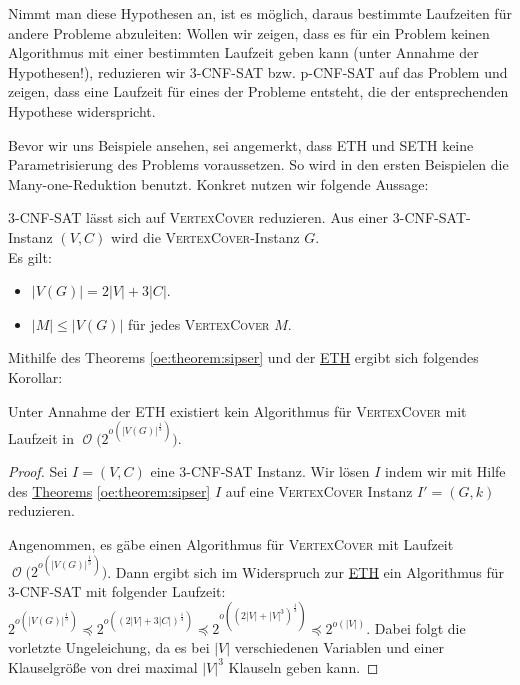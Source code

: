 \documentclass[a4paper,ngerman]{atseminar}
\newcommand{\BigO}[1]{\ensuremath{\operatorname{\mathcal{O}}\bigl(#1\bigr)}\xspace}
\begin{document}
\noindent
Nimmt man diese Hypothesen an, ist es möglich, daraus bestimmte Laufzeiten für andere Probleme abzuleiten: Wollen wir zeigen, dass es für ein Problem keinen Algorithmus mit einer bestimmten Laufzeit geben kann
(unter Annahme der Hypothesen!), reduzieren wir 3-\textsc{CNF-SAT} bzw. p-\textsc{CNF-SAT} auf das Problem und zeigen, dass eine Laufzeit für eines der Probleme
entsteht, die der entsprechenden Hypothese widerspricht.

\noindent
Bevor wir uns Beispiele ansehen, sei angemerkt, dass ETH und SETH keine Parametrisierung des Problems voraussetzen. So wird in den ersten Beispielen die Many-one-Reduktion benutzt.
Konkret nutzen wir folgende Aussage:


\begin{theorem}
  \label{oe:theorem:sipser}
  \textsc{3-\textsc{CNF-SAT}} lässt sich auf \textsc{VertexCover} reduzieren.
                Aus einer \textsc{3-\textsc{CNF-SAT}}-Instanz $(V, C)$ wird die \textsc{VertexCover}-Instanz $G$.
                \\
                Es gilt:
                \begin{itemize}
                    \item $|V(G)| = 2|V| + 3|C| $.
                    \item $|M| \leq |V(G)|$ für jedes \textsc{VertexCover} $M$.
                \end{itemize}
\end{theorem}

\noindent
Mithilfe des Theorems \ref{oe:theorem:sipser} und der \hyperref[oe:definition:eth]{ETH} ergibt sich folgendes Korollar:

\begin{corollary}
  Unter Annahme der ETH existiert kein Algorithmus für \textsc{VertexCover} mit Laufzeit in \BigO{2^{o(|V(G)|^{\frac{1}{3}})}}.
\end{corollary}
\begin{proof}
  Sei $I = (V, C)$ eine 3-\textsc{CNF-SAT} Instanz. Wir lösen $I$ indem wir mit Hilfe des \hyperref[oe:theorem:sipser]{Theorems} \ref{oe:theorem:sipser}
  $I$ auf eine \textsc{VertexCover} Instanz $I' = (G, k)$ reduzieren.

  \noindent
  Angenommen, es gäbe einen Algorithmus für \textsc{VertexCover} mit Laufzeit \BigO{2^{o(|V(G)|^{\frac{1}{3}})}}.
  Dann ergibt sich im Widerspruch zur \hyperref[oe:definition:eth]{ETH} ein Algorithmus für 3-\textsc{CNF-SAT} mit folgender Laufzeit:
  $2^{o(|V(G)|^{\frac{1}{3}})} \preceq 2^{o((2|V| + 3|C|)^{\frac{1}{3}})} \preceq 2^{o((2|V| + |V|^3)^{\frac{1}{3}})} \preceq 2^{o(|V|)}$.
  Dabei folgt die vorletzte Ungeleichung, da es bei $|V|$ verschiedenen Variablen und einer Klauselgröße von drei maximal $|V|^3$ Klauseln geben kann.
\end{proof}
\end{document}
